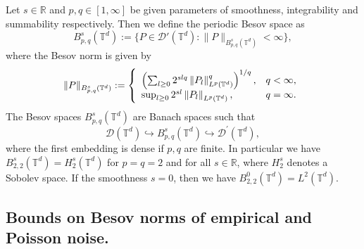 \documentclass[10pt]{iopart}
\begin{document}
Let $s\in\mathbb{R}$ and $p, q\in [1, \infty]$ be given parameters of smoothness, integrability and summability respectively.  
Then we define the periodic Besov space as
\begin{equation*}
B_{p, q}^{s}(\mathbb{T}^{d}):=\{P\in \mathscr{D}'(\mathbb{T}^{d}): \|P\|_{B_{p, q}^{s}(\mathbb{T}^{d})}<\infty\},
\end{equation*}
where the Besov norm is given by
\begin{equation*}
\|P\|_{B_{p, q}^{s}(\mathbb{T}^{d})}:=
\left\{\begin{array}{l l}
\left(\sum_{l\geq 0}2^{slq}\left\|P_l\right\|_{L^{p}(\mathbb{T}^{d})}^{q}\right)^{1/q},&
q<\infty,\\
\sup_{l\geq 0}2^{sl}\left\|P_l\right\|_{L^{p}(\mathbb{T}^{d})},&q=\infty.
\end{array}\right.
\end{equation*}
The Besov spaces $B_{p, q}^{s}(\mathbb{T}^{d})$ are Banach spaces such that
\begin{equation*}
\mathscr{D}(\mathbb{T}^{d})\hookrightarrow B_{p, q}^{s}(\mathbb{T}^{d})\hookrightarrow \mathscr{D}^{'}(\mathbb{T}^{d}),
\end{equation*}
where the first embedding is dense if $p, q$ are finite. In particular we have $B_{2,2}^{s}(\mathbb{T}^{d})=H_{2}^{s}(\mathbb{T}^{d})$ for $p=q=2$ and for all
$s\in\mathbb{R}$, where $H_{2}^{s}$ denotes a Sobolev space. If the smoothness $s=0$, then we have $B_{2,2}^{0}(\mathbb{T}^{d})=L^{2}(\mathbb{T}^{d})$.


\subsection{Bounds on Besov norms of empirical and Poisson noise.}
\end{document}
